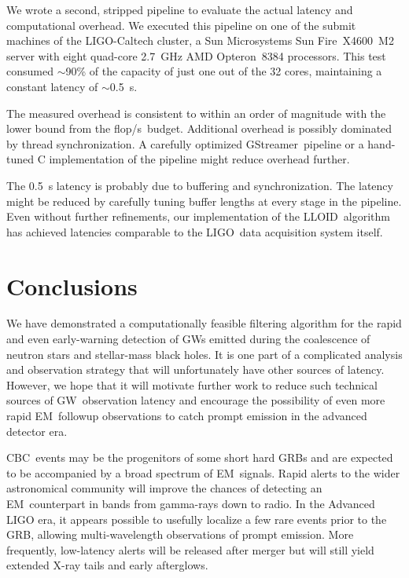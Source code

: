 \documentclass[preprint2]{aastex}
\newcommand{\GW}{GW}%
\newcommand{\EM}{EM}%
\newcommand{\GRB}{GRB}%
\newcommand{\CBC}{CBC}%
\newcommand{\LIGO}{LIGO}%
\newcommand{\flops}{flop/s}
\newcommand{\gstreamer}{GStreamer}
\newcommand{\lloid}{LLOID}%
\begin{document}
We wrote a second, stripped pipeline to evaluate the actual latency and
computational overhead.  We executed this pipeline on one of the submit
machines of the \LIGO-Caltech cluster, a Sun Microsystems Sun
Fire\texttrademark\ X4600~M2 server with eight quad-core 2.7~GHz AMD
Opteron\texttrademark\ 8384 processors.  This test consumed $\sim$90\% of the
capacity of just one out of the 32 cores, maintaining a constant latency of
$\sim$0.5~s.

The measured overhead is consistent to within an order of magnitude with the
lower bound from the \flops\ budget.  Additional overhead is possibly
dominated by thread synchronization.  A carefully optimized \gstreamer\
pipeline or a hand-tuned C implementation of the pipeline might reduce overhead
further.

The 0.5~s latency is probably due to buffering and synchronization.  The latency
might be reduced by carefully tuning buffer lengths at every stage in the
pipeline.  Even without further refinements, our implementation of the \lloid\
algorithm has achieved latencies comparable to the \LIGO\ data acquisition
system itself.  

\section{Conclusions}

We have demonstrated a computationally feasible filtering algorithm for the rapid
and even early-warning detection of \GW{}s emitted during the coalescence
of neutron stars and stellar-mass black holes.  It is one part of a complicated
analysis and observation strategy that will unfortunately have other sources of
latency.  However, we hope that it will motivate further work to reduce such
technical sources of \GW\ observation latency and encourage the possibility of
even more rapid \EM\ followup observations to catch prompt emission in the
advanced detector era.

\CBC\ events may be the progenitors of some short hard \GRB{}s and are expected
to be accompanied by a broad spectrum of \EM\ signals. Rapid alerts to the
wider astronomical community will improve the chances of detecting an \EM\
counterpart in bands from gamma-rays down to radio. In the Advanced LIGO
era, it appears possible to usefully localize a few rare events prior to the
\GRB{}, allowing multi-wavelength observations of prompt emission. More
frequently, low-latency alerts will be released after merger but will still
yield extended X-ray tails and early afterglows.
\end{document}
